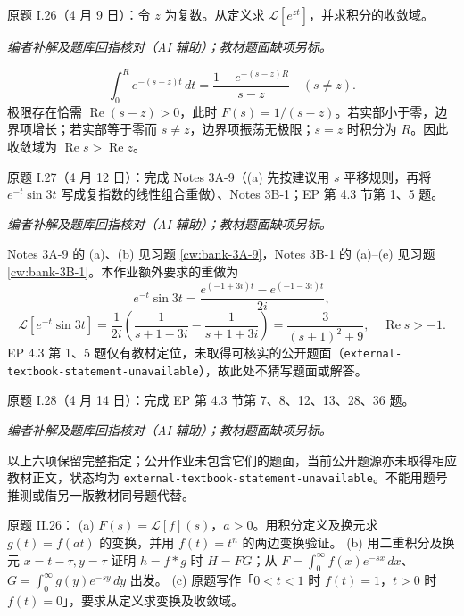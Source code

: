 \begin{exercise}\label{cw:ps7-I-26}原题 I.26（4 月 9 日）：令 $z$ 为复数。从定义求 $\mathcal L[e^{zt}]$，并求积分的收敛域。\end{exercise}
\begin{solution}
\textit{编者补解及题库回指核对（AI 辅助）；教材题面缺项另标。}\par

\[\int_0^R e^{-(s-z)t}\,dt=\frac{1-e^{-(s-z)R}}{s-z}\quad(s\ne z).\]
极限存在恰需 $\operatorname{Re}(s-z)>0$，此时 $F(s)=1/(s-z)$。若实部小于零，边界项增长；若实部等于零而 $s\ne z$，边界项振荡无极限；$s=z$ 时积分为 $R$。因此收敛域为 $\operatorname{Re}s>\operatorname{Re}z$。
\end{solution}
\begin{exercise}\label{cw:ps7-I-27}原题 I.27（4 月 12 日）：完成 Notes 3A-9（(a) 先按建议用 $s$ 平移规则，再将 $e^{-t}\sin3t$ 写成复指数的线性组合重做）、Notes 3B-1；EP 第 4.3 节第 1、5 题。\end{exercise}
\begin{solution}
\textit{编者补解及题库回指核对（AI 辅助）；教材题面缺项另标。}\par

Notes 3A-9 的 (a)、(b) 见习题 \ref{cw:bank-3A-9}，Notes 3B-1 的 (a)--(e) 见习题 \ref{cw:bank-3B-1}。本作业额外要求的重做为
\[e^{-t}\sin3t=\frac{e^{(-1+3i)t}-e^{(-1-3i)t}}{2i},\]
\[\mathcal L[e^{-t}\sin3t]=\frac1{2i}\left(\frac1{s+1-3i}-\frac1{s+1+3i}\right)=\frac3{(s+1)^2+9},\quad\operatorname{Re}s>-1.\]
EP 4.3 第 1、5 题仅有教材定位，未取得可核实的公开题面（\texttt{external-textbook-statement-unavailable}），故此处不猜写题面或解答。
\end{solution}
\begin{exercise}\label{cw:ps7-I-28}原题 I.28（4 月 14 日）：完成 EP 第 4.3 节第 7、8、12、13、28、36 题。\end{exercise}
\begin{solution}
\textit{编者补解及题库回指核对（AI 辅助）；教材题面缺项另标。}\par

以上六项保留完整指定；公开作业未包含它们的题面，当前公开题源亦未取得相应教材正文，状态均为 \texttt{external-textbook-statement-unavailable}。不能用题号推测或借另一版教材同号题代替。
\end{solution}
\begin{exercise}\label{cw:ps7-II-26}原题 II.26：
(a) $F(s)=\mathcal L[f](s)$，$a>0$。用积分定义及换元求 $g(t)=f(at)$ 的变换，并用 $f(t)=t^n$ 的两边变换验证。
(b) 用二重积分及换元 $x=t-\tau,y=\tau$ 证明 $h=f*g$ 时 $H=FG$；从 $F=\int_0^\infty f(x)e^{-sx}\,dx$、$G=\int_0^\infty g(y)e^{-sy}\,dy$ 出发。
(c) 原题写作「$0<t<1$ 时 $f(t)=1$，$t>0$ 时 $f(t)=0$」，要求从定义求变换及收敛域。\end{exercise}
